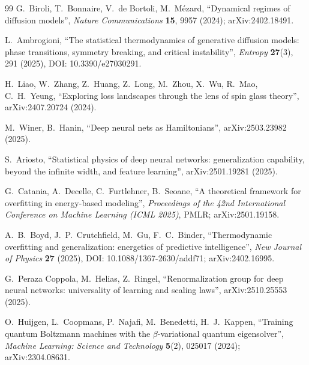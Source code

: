 \documentclass[12pt]{article}
\begin{document}
\begin{thebibliography}{99}
G.~Biroli, T.~Bonnaire, V.~de Bortoli, M.~Mézard, ``Dynamical regimes of diffusion models'', \textit{Nature Communications} \textbf{15}, 9957 (2024); arXiv:2402.18491.

L.~Ambrogioni, ``The statistical thermodynamics of generative diffusion models: phase transitions, symmetry breaking, and critical instability'', \textit{Entropy} \textbf{27}(3), 291 (2025), DOI: 10.3390/e27030291.

H.~Liao, W.~Zhang, Z.~Huang, Z.~Long, M.~Zhou, X.~Wu, R.~Mao, C.~H.~Yeung, ``Exploring loss landscapes through the lens of spin glass theory'', arXiv:2407.20724 (2024).

M.~Winer, B.~Hanin, ``Deep neural nets as Hamiltonians'', arXiv:2503.23982 (2025).

S.~Ariosto, ``Statistical physics of deep neural networks: generalization capability, beyond the infinite width, and feature learning'', arXiv:2501.19281 (2025).

G.~Catania, A.~Decelle, C.~Furtlehner, B.~Seoane, ``A theoretical framework for overfitting in energy-based modeling'', \textit{Proceedings of the 42nd International Conference on Machine Learning (ICML 2025)}, PMLR; arXiv:2501.19158.

A.~B.~Boyd, J.~P.~Crutchfield, M.~Gu, F.~C.~Binder, ``Thermodynamic overfitting and generalization: energetics of predictive intelligence'', \textit{New Journal of Physics} \textbf{27} (2025), DOI: 10.1088/1367-2630/addf71; arXiv:2402.16995.

G.~Peraza Coppola, M.~Helias, Z.~Ringel, ``Renormalization group for deep neural networks: universality of learning and scaling laws'', arXiv:2510.25553 (2025).

O.~Huijgen, L.~Coopmans, P.~Najafi, M.~Benedetti, H.~J.~Kappen, ``Training quantum Boltzmann machines with the $\beta$-variational quantum eigensolver'', \textit{Machine Learning: Science and Technology} \textbf{5}(2), 025017 (2024); arXiv:2304.08631.

\end{thebibliography}
\end{document}
